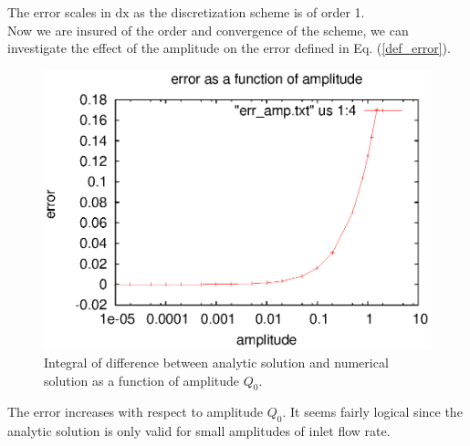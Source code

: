 \documentclass{config}
\begin{document}
The error scales in $\mathrm{dx}$ as the discretization scheme is of order 1. \\

Now we are insured of the order and convergence of the scheme, we can investigate the effect of the amplitude on the error defined in Eq. (\ref{def_error}).

\begin{figure}[H]
\begin{center}
\includegraphics[scale=1]{figures/erreur_amplitude.eps}
\caption{Integral of difference between analytic solution and numerical solution as a function of amplitude $Q_0$.}
\label{err_amp}
\end{center}
\end{figure}

The error increases with respect to amplitude $Q_0$. It seems fairly logical since the analytic solution is only valid for small amplitudes of inlet flow rate. \\ 
\end{document}

